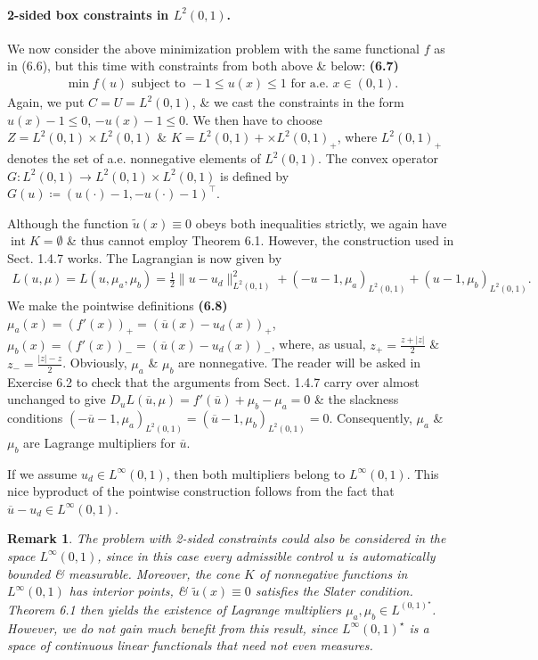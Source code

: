 \documentclass[oneside]{book}
\numberwithin{equation}{section}
\newtheorem{remark}{Remark}[chapter]
\begin{document}
\paragraph{2-sided box constraints in $L^2(0,1)$.} We now consider the above minimization problem with the same functional $f$ as in (6.6), but this time with constraints from both above \& below: \textbf{(6.7)}
\begin{align*}
	\min f(u)\mbox{ subject to } -1\le u(x)\le 1\mbox{ for a.e. } x\in(0,1).
\end{align*}
Again, we put $C = U = L^2(0,1)$, \& we cast the constraints in the form $u(x) - 1\le 0$, $-u(x) - 1\le 0$. We then have to choose $Z = L^2(0,1)\times L^2(0,1)$ \& $K = L^2(0,1)+\times L^2(0,1)_+$, where $L^2(0,1)_+$ denotes the set of a.e. nonnegative elements of $L^2(0,1)$. The convex operator $G:L^2(0,1)\to L^2(0,1)\times L^2(0,1)$ is defined by $G(u)\coloneqq(u(\cdot) - 1,-u(\cdot) - 1)^\top$.

Although the function $\widetilde{u}(x)\equiv 0$ obeys both inequalities strictly, we again have $\operatorname{int}K = \emptyset$ \& thus cannot employ Theorem 6.1. However, the construction used in Sect. 1.4.7 works. The Lagrangian is now given by
\begin{align*}
	L(u,\mu) = L(u,\mu_a,\mu_b) = \frac{1}{2}\|u - u_d\|_{L^2(0,1)}^2 + (-u - 1,\mu_a)_{L^2(0,1)} + (u - 1,\mu_b)_{L^2(0,1)}.
\end{align*}
We make the pointwise definitions \textbf{(6.8)} $\mu_a(x) = (f'(x))_+ = (\overline{u}(x) - u_d(x))_+$, $\mu_b(x) = (f'(x))_- = (\overline{u}(x) - u_d(x))_-$, where, as usual, $z_+ = \frac{z + |z|}{2}$ \& $z_- = \frac{|z| - z}{2}$. Obviously, $\mu_a$ \& $\mu_b$ are nonnegative. The reader will be asked in Exercise 6.2 to check that the arguments from Sect. 1.4.7 carry over almost unchanged to give $D_uL(\overline{u},\mu) = f'(\overline{u}) + \mu_b - \mu_a = 0$ \& the slackness conditions $(-\overline{u} - 1,\mu_a)_{L^2(0,1)} = (\overline{u} - 1,\mu_b)_{L^2(0,1)} = 0$. Consequently, $\mu_a$ \& $\mu_b$ are Lagrange multipliers for $\overline{u}$.

If we assume $u_d\in L^\infty(0,1)$, then both multipliers belong to $L^\infty(0,1)$. This nice byproduct of the pointwise construction follows from the fact that $\overline{u} - u_d\in L^\infty(0,1)$.

\begin{remark}
	The problem with 2-sided constraints could also be considered in the space $L^\infty(0,1)$, since in this case every admissible control $u$ is automatically bounded \& measurable. Moreover, the cone $K$ of nonnegative functions in $L^\infty(0,1)$ has interior points, \& $\widetilde{u}(x)\equiv 0$ satisfies the Slater condition. Theorem 6.1 then yields the existence of Lagrange multipliers $\mu_a,\mu_b\in L^(0,1)^\star$. However, we do not gain much benefit from this result, since $L^\infty(0,1)^\star$ is a space of continuous linear functionals that need not even measures.
\end{remark}
\end{document}

